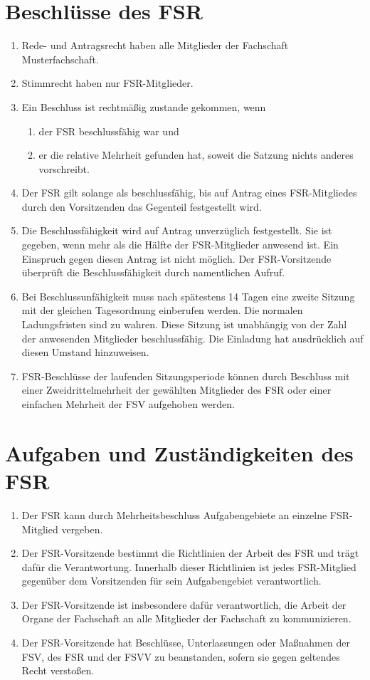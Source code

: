 \documentclass{article}
\newcommand{\fachschaft}{Musterfachschaft}
\begin{document}
\section{Beschlüsse des FSR}
\begin{enumerate}[(1)]
    \item Rede- und Antragsrecht haben alle Mitglieder der Fachschaft \fachschaft.
	\item Stimmrecht haben nur FSR-Mitglieder.
	\item Ein Beschluss ist rechtmäßig zustande gekommen, wenn
	\begin{enumerate}[1.]
		\item der FSR beschlussfähig war und
		\item er die relative Mehrheit gefunden hat, soweit die Satzung nichts anderes vorschreibt.
	\end{enumerate}
	\item Der FSR gilt solange als beschlussfähig, bis auf Antrag eines FSR-Mitgliedes durch den Vorsitzenden das Gegenteil festgestellt wird.
	\item Die Beschlussfähigkeit wird auf Antrag unverzüglich festgestellt. Sie ist gegeben, wenn mehr als die Hälfte der FSR-Mitglieder anwesend ist. Ein Einspruch gegen diesen Antrag ist nicht möglich. Der FSR-Vorsitzende überprüft die Beschlussfähigkeit durch namentlichen Aufruf.
	\item Bei Beschlussunfähigkeit muss nach spätestens 14 Tagen eine zweite Sitzung mit der gleichen Tagesordnung einberufen werden. Die normalen Ladungsfristen sind zu wahren. Diese Sitzung ist unabhängig von der Zahl der anwesenden Mitglieder beschlussfähig. Die Einladung hat ausdrücklich auf diesen Umstand hinzuweisen.
    \item FSR-Beschlüsse der laufenden Sitzungsperiode können durch Beschluss mit einer Zweidrittelmehrheit der gewählten Mitglieder des FSR oder einer einfachen Mehrheit der FSV aufgehoben werden.
\end{enumerate}

\section{Aufgaben und Zuständigkeiten des FSR}
\begin{enumerate}[(1)]
    \item Der FSR kann durch Mehrheitsbeschluss Aufgabengebiete an einzelne FSR-Mitglied vergeben.
    \item Der FSR-Vorsitzende bestimmt die Richtlinien der Arbeit des FSR und trägt dafür die Verantwortung. Innerhalb dieser Richtlinien ist jedes FSR-Mitglied gegenüber dem Vorsitzenden für sein Aufgabengebiet verantwortlich.
	\item Der FSR-Vorsitzende ist insbesondere dafür verantwortlich, die Arbeit der Organe der Fachschaft an alle Mitglieder der Fachschaft zu kommunizieren.
	\item Der FSR-Vorsitzende hat Beschlüsse, Unterlassungen oder Maßnahmen der FSV, des FSR und der FSVV zu beanstanden, sofern sie gegen geltendes Recht verstoßen.
\end{enumerate}
\end{document}
